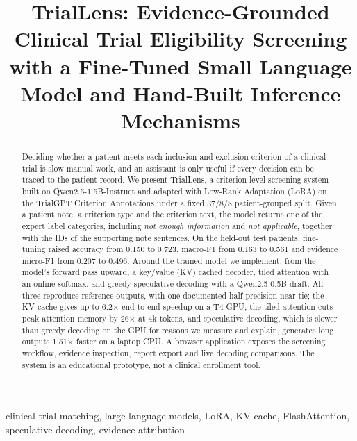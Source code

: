 \documentclass[conference]{IEEEtran}
\begin{document}
\title{TrialLens: Evidence-Grounded Clinical Trial Eligibility Screening with a Fine-Tuned Small Language Model and Hand-Built Inference Mechanisms}

\author{
}

\maketitle

\begin{abstract}
Deciding whether a patient meets each inclusion and exclusion criterion of a clinical trial is slow manual work, and an assistant is only useful if every decision can be traced to the patient record. We present TrialLens, a criterion-level screening system built on Qwen2.5-1.5B-Instruct and adapted with Low-Rank Adaptation (LoRA) on the TrialGPT Criterion Annotations under a fixed 37/8/8 patient-grouped split. Given a patient note, a criterion type and the criterion text, the model returns one of the expert label categories, including \emph{not enough information} and \emph{not applicable}, together with the IDs of the supporting note sentences. On the held-out test patients, fine-tuning raised accuracy from 0.150 to 0.723, macro-F1 from 0.163 to 0.561 and evidence micro-F1 from 0.207 to 0.496. Around the trained model we implement, from the model's forward pass upward, a key/value (KV) cached decoder, tiled attention with an online softmax, and greedy speculative decoding with a Qwen2.5-0.5B draft. All three reproduce reference outputs, with one documented half-precision near-tie; the KV cache gives up to 6.2$\times$ end-to-end speedup on a T4 GPU, the tiled attention cuts peak attention memory by 26$\times$ at 4k tokens, and speculative decoding, which is slower than greedy decoding on the GPU for reasons we measure and explain, generates long outputs 1.51$\times$ faster on a laptop CPU. A browser application exposes the screening workflow, evidence inspection, report export and live decoding comparisons. The system is an educational prototype, not a clinical enrollment tool.
\end{abstract}

\begin{IEEEkeywords}
clinical trial matching, large language models, LoRA, KV cache, FlashAttention, speculative decoding, evidence attribution
\end{IEEEkeywords}
\end{document}
